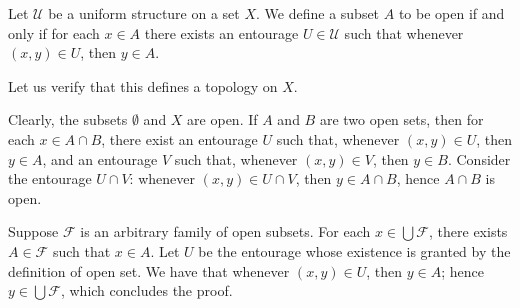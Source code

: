 \documentclass[12pt]{article}
\begin{document}
Let $\mathcal{U}$ be a uniform structure on a set $X$. We define a subset $A$ to be open if and only if for each $x \in A$ there exists an entourage $U \in \mathcal{U}$ such that whenever $(x,y) \in U$, then $y \in A$.

Let us verify that this defines a topology on $X$.

Clearly, the subsets $\emptyset$ and $X$ are open. If $A$ and $B$ are two open sets, then for each $x \in A \cap B$, there exist an entourage $U$ such that, whenever $(x,y) \in U$, then $y \in A$, and an entourage $V$ such that, whenever $(x,y) \in V$, then $y \in B$. Consider the entourage $U \cap V$: whenever $(x,y) \in U\cap V$, then $y \in A \cap B$, hence $A \cap B$ is open.

Suppose $\mathcal{F}$ is an arbitrary family of open subsets. For each $x \in \bigcup \mathcal{F}$, there exists $A \in \mathcal{F}$ such that $x \in A$. Let $U$ be the entourage whose existence is granted by the definition of open set. We have that whenever $(x,y) \in U$, then $y \in A$; hence $y \in \bigcup \mathcal{F}$, which concludes the proof.
\end{document}
